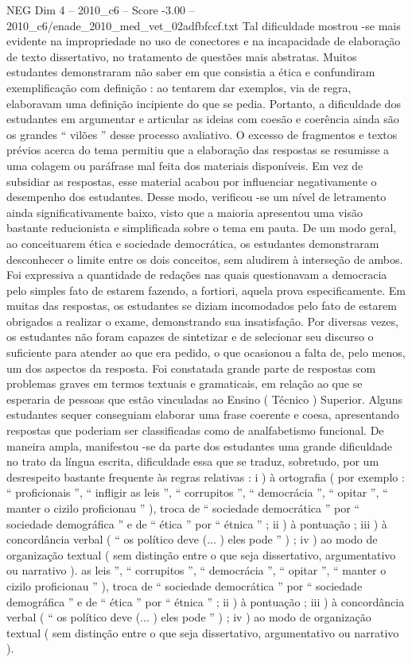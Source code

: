 \begin{textsample}{NEG Dim 4 – 2010\_c6 – Score -3.00 – 2010\_c6/enade\_2010\_med\_vet\_02adfbfccf.txt}
Tal dificuldade mostrou -se mais evidente na impropriedade no uso de conectores e na incapacidade de elaboração de texto dissertativo, no tratamento de questões mais abstratas.
Muitos estudantes demonstraram não saber em que consistia a ética e confundiram exemplificação com definição : ao tentarem dar exemplos, via de regra, elaboravam uma definição incipiente do que se pedia.
Portanto, a dificuldade dos estudantes em argumentar e articular as ideias com coesão e coerência ainda são os grandes “ vilões ” desse processo avaliativo.
O excesso de fragmentos e textos prévios acerca do tema permitiu que a elaboração das respostas se resumisse a uma colagem ou paráfrase mal feita dos materiais disponíveis.
Em vez de subsidiar as respostas, esse material acabou por influenciar negativamente o desempenho dos estudantes.
Desse modo, verificou -se um nível de letramento ainda significativamente baixo, visto que a maioria apresentou uma visão bastante reducionista e simplificada sobre o tema em pauta.
De um modo geral, ao conceituarem ética e sociedade democrática, os estudantes demonstraram desconhecer o limite entre os dois conceitos, sem aludirem à interseção de ambos.
Foi expressiva a quantidade de redações nas quais questionavam a democracia pelo simples fato de estarem fazendo, a fortiori, aquela prova especificamente.
Em muitas das respostas, os estudantes se diziam incomodados pelo fato de estarem obrigados a realizar o exame, demonstrando sua insatisfação.
Por diversas vezes, os estudantes não foram capazes de sintetizar e de selecionar seu discurso o suficiente para atender ao que era pedido, o que ocasionou a falta de, pelo menos, um dos aspectos da resposta.
Foi constatada grande parte de respostas com problemas graves em termos textuais e gramaticais, em relação ao que se esperaria de pessoas que estão vinculadas ao Ensino ( Técnico ) Superior.
Alguns estudantes sequer conseguiam elaborar uma frase coerente e coesa, apresentando respostas que poderiam ser classificadas como de analfabetismo funcional.
De maneira ampla, manifestou -se da parte dos estudantes uma grande dificuldade no trato da língua escrita, dificuldade essa que se traduz, sobretudo, por um desrespeito bastante frequente às regras relativas : i ) à ortografia ( por exemplo : “ proficionais ”, “ infligir as leis ”, “ corrupitos ”, “ democrácia ”, “ opitar ”, “ manter o cizilo proficionau ” ), troca de “ sociedade democrática ” por “ sociedade demográfica ” e de “ ética ” por “ étnica ” ; ii ) à pontuação ; iii ) à concordância verbal ( “ os político deve (... ) eles pode ” ) ; iv ) ao modo de organização textual ( sem distinção entre o que seja dissertativo, argumentativo ou narrativo ). as leis ”, “ corrupitos ”, “ democrácia ”, “ opitar ”, “ manter o cizilo proficionau ” ), troca de “ sociedade democrática ” por “ sociedade demográfica ” e de “ ética ” por “ étnica ” ; ii ) à pontuação ; iii ) à concordância verbal ( “ os político deve (... ) eles pode ” ) ; iv ) ao modo de organização textual ( sem distinção entre o que seja dissertativo, argumentativo ou narrativo ).

\end{textsample}
